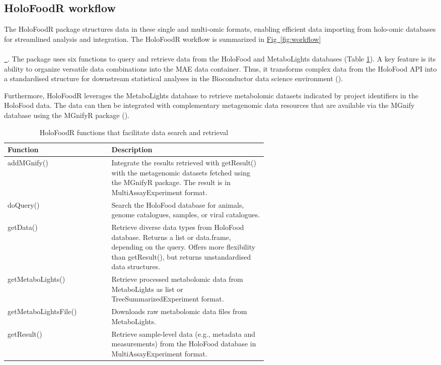 \documentclass[unnumsec,webpdf,namedate,modern,large]{oup-authoring-template}%
\newcommand*{\figref}[2][]{%
  \hyperref[{fig:#2}]{%
    Fig~\ref*{fig:#2}%
    \ifx\\#1\\%
    \else
      \,#1%
    \fi
  }%
}
\begin{document}
\vspace{-1em}
\subsection{HoloFoodR workflow}

The HoloFoodR package structures data in these single and multi-omic formats, enabling efficient data importing from holo-omic databases for streamlined analysis and integration. The HoloFoodR workflow is summarized in \figref{workflow}. The package uses six functions to query and retrieve data from the HoloFood and MetaboLights databases (Table \ref{tab:holofoodr_functions}). A key feature is its ability to organize versatile data combinations into the MAE data container. Thus, it transforms complex data from the HoloFood API into a standardised structure for downstream statistical analyses in the Bioconductor data science environment  (\cite{ramos_software_2017}).

Furthermore, HoloFoodR leverages the MetaboLights database to retrieve metabolomic datasets indicated by project identifiers in the HoloFood data. The data can then be integrated with complementary metagenomic data resources that are available via the MGnify database using the MGnifyR package (\cite{mgnifyr}).

\vspace{-1em}

\begin{table}[H]
\begin{center}
\begin{minipage}{\linewidth}
\caption{HoloFoodR functions that facilitate data search and retrieval}\label{tab:holofoodr_functions}
    \begin{tabular}{l p{0.6\linewidth}}
        \toprule
        Function & Description \\ 
        \midrule
        addMGnify() & Integrate the results retrieved with getResult() with the metagenomic datasets fetched using the MGnifyR package. The result is in MultiAssayExperiment format. \\
        doQuery() & Search the HoloFood database for animals, genome catalogues, samples, or viral catalogues. \\
        getData() & Retrieve diverse data types from HoloFood database. Returns a list or data.frame, depending on the query. Offers more flexibility than getResult(), but returns unstandardised data structures. \\
        getMetaboLights() & Retrieve processed metabolomic data from MetaboLights as list or TreeSummarizedExperiment format. \\
        getMetaboLightsFile() & Downloads raw metabolomic data files from MetaboLights. \\
        getResult()  & Retrieve sample-level data (e.g., metadata and measurements) from the HoloFood database in MultiAssayExperiment format. \\
        \bottomrule
    \end{tabular}
\end{minipage}
\end{center}
\end{table}
\end{document}
